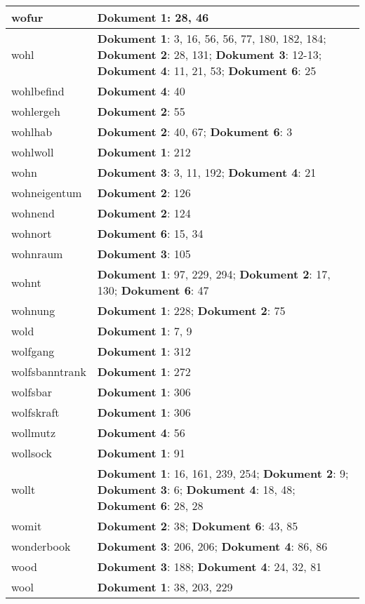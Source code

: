 \documentclass[a5paper]{article}
\begin{document}
\begin{longtable}[l]{|l|p{3in}|}
\hline
wofur & \textbf{Dokument 1}: 28, 46 \\
\hline
wohl & \textbf{Dokument 1}: 3, 16, 56, 56, 77, 180, 182, 184; \textbf{Dokument 2}: 28, 131; \textbf{Dokument 3}: 12-13; \textbf{Dokument 4}: 11, 21, 53; \textbf{Dokument 6}: 25 \\
\hline
wohlbefind & \textbf{Dokument 4}: 40 \\
\hline
wohlergeh & \textbf{Dokument 2}: 55 \\
\hline
wohlhab & \textbf{Dokument 2}: 40, 67; \textbf{Dokument 6}: 3 \\
\hline
wohlwoll & \textbf{Dokument 1}: 212 \\
\hline
wohn & \textbf{Dokument 3}: 3, 11, 192; \textbf{Dokument 4}: 21 \\
\hline
wohneigentum & \textbf{Dokument 2}: 126 \\
\hline
wohnend & \textbf{Dokument 2}: 124 \\
\hline
wohnort & \textbf{Dokument 6}: 15, 34 \\
\hline
wohnraum & \textbf{Dokument 3}: 105 \\
\hline
wohnt & \textbf{Dokument 1}: 97, 229, 294; \textbf{Dokument 2}: 17, 130; \textbf{Dokument 6}: 47 \\
\hline
wohnung & \textbf{Dokument 1}: 228; \textbf{Dokument 2}: 75 \\
\hline
wold & \textbf{Dokument 1}: 7, 9 \\
\hline
wolfgang & \textbf{Dokument 1}: 312 \\
\hline
wolfsbanntrank & \textbf{Dokument 1}: 272 \\
\hline
wolfsbar & \textbf{Dokument 1}: 306 \\
\hline
wolfskraft & \textbf{Dokument 1}: 306 \\
\hline
wollmutz & \textbf{Dokument 4}: 56 \\
\hline
wollsock & \textbf{Dokument 1}: 91 \\
\hline
wollt & \textbf{Dokument 1}: 16, 161, 239, 254; \textbf{Dokument 2}: 9; \textbf{Dokument 3}: 6; \textbf{Dokument 4}: 18, 48; \textbf{Dokument 6}: 28, 28 \\
\hline
womit & \textbf{Dokument 2}: 38; \textbf{Dokument 6}: 43, 85 \\
\hline
wonderbook & \textbf{Dokument 3}: 206, 206; \textbf{Dokument 4}: 86, 86 \\
\hline
wood & \textbf{Dokument 3}: 188; \textbf{Dokument 4}: 24, 32, 81 \\
\hline
wool & \textbf{Dokument 1}: 38, 203, 229 \\

\end{longtable}
\end{document}
